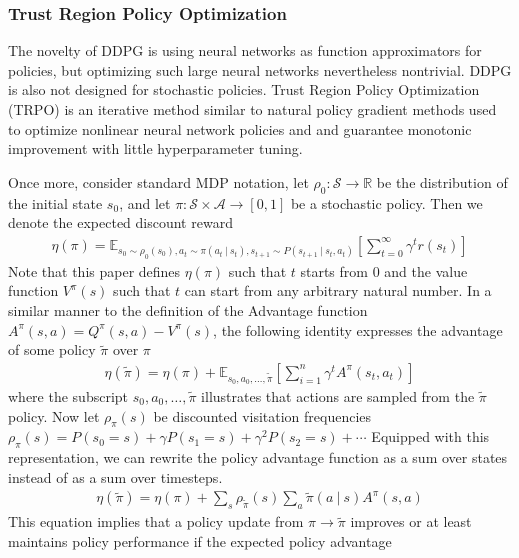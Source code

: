 \subsubsection{Trust Region Policy Optimization}

The novelty of DDPG is using neural networks as function approximators for policies, 
but optimizing such large neural networks nevertheless nontrivial. DDPG is also not designed for stochastic 
policies. Trust Region Policy Optimization (TRPO) \cite{trpo} is an iterative method similar to natural policy gradient methods 
used to optimize nonlinear neural network policies and and guarantee monotonic improvement 
with little hyperparameter tuning. 

Once more, consider standard MDP notation, let $\rho_0: \mathcal{S} \to \mathbb{R}$ be the distribution
of the initial state $s_0$, and let $\pi: \mathcal{S} \times \mathcal{A} \to [0, 1]$
be a stochastic policy. Then we denote the expected discount reward 
\begin{align*}
  \eta(\pi) = \mathbb{E}_{s_0 \sim \rho_0(s_0), a_t \sim \pi(a_t \:|\: s_t), s_{t+1} \sim P(s_{t+1} \:|\: s_t, a_t)} \left[ \sum_{t=0}^\infty \gamma^t r(s_t) \right]
\end{align*}
Note that this paper defines $\eta(\pi)$ such that $t$ starts from $0$ and the value function $V^\pi(s)$ such that 
$t$ can start from any arbitrary natural number. In a similar manner to the definition of the Advantage function $A^\pi(s, a) = Q^\pi(s,a) - V^\pi(s)$, 
the following identity expresses the advantage of some policy $\tilde{\pi}$ over $\pi$
\begin{align*}
  \eta(\tilde{\pi}) = \eta(\pi) + \mathbb{E}_{s_0, a_0, \ldots, \tilde{\pi}} \left[ \sum_{i=1}^n \gamma^t A^\pi (s_t, a_t)\right]
\end{align*}
where the subscript $s_0, a_0, \ldots, \tilde{\pi}$ illustrates that actions are sampled from the $\tilde{\pi}$ policy. Now let $\rho_{\pi}(s)$ be discounted visitation frequencies 
$\rho_\pi(s) = P(s_0 = s) + \gamma P(s_1 = s) + \gamma^2 P(s_2 = s) + \cdots$
Equipped with this representation, we can rewrite the policy advantage function as a sum over states instead of as a sum over timesteps.
\begin{align*}
  \eta (\tilde{\pi}) = \eta(\pi) + \sum_s \rho_{\tilde{\pi}}(s) \sum_a \tilde{\pi}(a \:|\: s) A^\pi(s, a)
\end{align*}
This equation implies that a policy update from $\pi \to \tilde{\pi}$ improves or at least maintains policy performance if the expected policy advantage 
